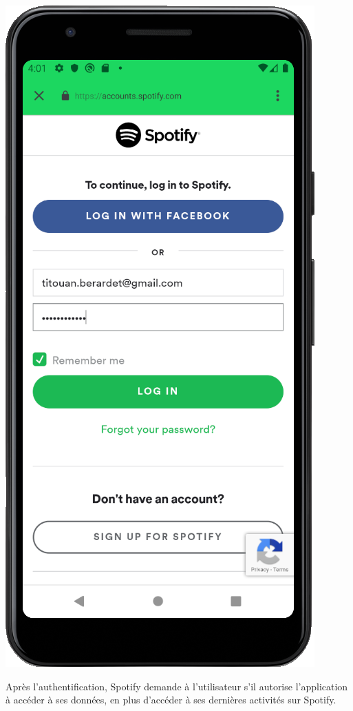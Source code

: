 \documentclass[12pt, openany]{report}
\begin{document}
    \includegraphics[scale=0.5]{images/authentification_exemple.png}
    
    \newpage
    
    Après l'authentification, Spotify demande à l'utilisateur s'il autorise l'application à accéder à ses données, en plus d'accéder à ses dernières activités sur Spotify.
    \\
    \\
    
\end{document}
